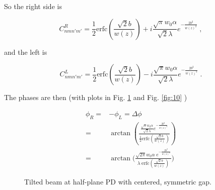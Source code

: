\documentclass[aps,twoside,secnumarabic,balancelastpage,amsmath,amssymb,nofootinbib,hyperref=pdftex]{revtex4}
\newcommand{\bigfrac}[2]{\Big( \frac{#1}{#2}\Big)}
\begin{document}
So the right side is

\begin{equation}
	C_{nmn'm'}^{R} =
		\frac{1} {2} \text{erfc}(\frac{\sqrt{2} b}{w(z)})
		+
		i \frac{\sqrt{\pi}w_0 \alpha }{\sqrt{2} \lambda} e^{-\frac{2 b^2}{w(z)^2}}
\;,
\end{equation}

and the left is

\begin{equation}
	C_{nmn'm'}^{L} =
		\frac{1} {2} \text{erfc}(\frac{\sqrt{2} b}{w(z)})
		-
		i \frac{\sqrt{\pi}w_0 \alpha }{\sqrt{2} \lambda} e^{-\frac{2 b^2}{w(z)^2}}
\;.
\end{equation}

The phases are then (with plots in Fig. \ref{fig:9} and Fig. \ref{fig:10} )

\begin{align*}
\phi_R =& - \phi_L = \Delta \phi
\\=&
 \arctan ( \frac{\frac{\sqrt{\pi}w_0 \alpha }{\sqrt{2} \lambda} e^{-\frac{2 b^2}{w(z)^2}}}{\frac{1} {2} \text{erfc}(\frac{\sqrt{2} b}{w(z)})})
 \\=&
  \arctan \bigfrac{\sqrt{2\pi} w_0 \alpha \; e^{-\frac{2 b^2}{w(z)^2}}}{ \lambda \; \text{erfc}(\frac{\sqrt{2} b}{w(z)})}
\end{align*}


	\begin{figure}
	\centering
	\caption{Tilted beam at half-plane PD with centered, symmetric gap.}
	\label{fig:9}
	\end{figure}
	
\end{document}
